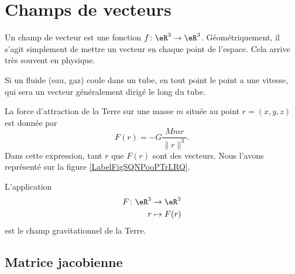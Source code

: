 \section{Champs de vecteurs}

Un champ de vecteur est une fonction $f\colon \eR^3\to \eR^3$. Géométriquement, il s'agit simplement de mettre un vecteur en chaque point de l'espace. Cela arrive très souvent en physique.

\begin{example}
    Si un fluide (eau, gaz) coule dans un tube, en tout point le point a une vitesse, qui sera un vecteur généralement dirigé le long du tube.
\end{example}

\begin{example}
    La force d'attraction de la Terre sur une masse $m$ située au point $r=(x,y,z)$ est donnée par
    \begin{equation}
        F(r)=-G\frac{ Mmr }{ \| r \|^3 }.
    \end{equation}
    Dans cette expression, tant $r$ que $F(r)$ sont des vecteurs. Nous l'avons représenté sur la figure \ref{LabelFigSQNPooPTrLRQ}. %
\newcommand{\CaptionFigSQNPooPTrLRQ}{Le champ de gravitation de la Terre.}


    L'application
    \begin{equation}
        \begin{aligned}
            F\colon \eR^3&\to \eR^3 \\
            r&\mapsto F(r) 
        \end{aligned}
    \end{equation}
    est le champ gravitationnel de la Terre.

\end{example}

\subsection{Matrice jacobienne}

